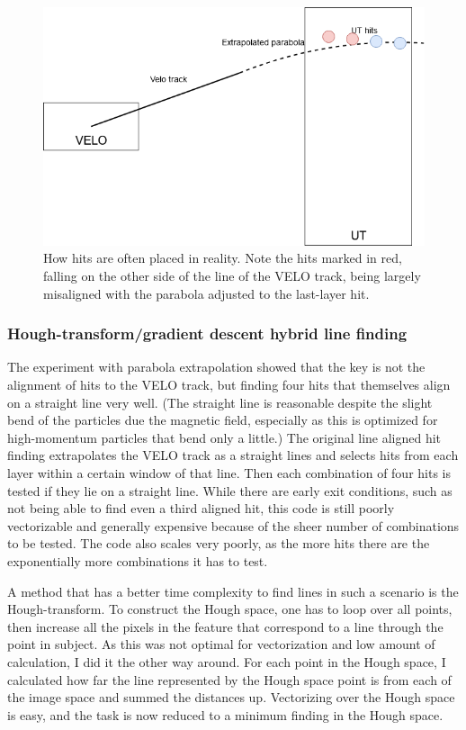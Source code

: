 \documentclass[12pt]{article}
\begin{document}
\begin{figure}[H]
	\begin{center}
		\includegraphics[width=.75\textwidth]{velout_parabola_misfit}
	\end{center}
	\caption{How hits are often placed in reality. Note the hits marked in red, falling on the other side of the line of the VELO track, being largely misaligned with the parabola adjusted to the last-layer hit.}
	\label{fig_velout_parabola_misfit}
\end{figure}


\subsubsection{Hough-transform/gradient descent hybrid line finding}

The experiment with parabola extrapolation showed that the key is not the alignment of hits to the VELO track, but finding four hits that themselves align on a straight line very well. (The straight line is reasonable despite the slight bend of the particles due the magnetic field, especially as this is optimized for high-momentum particles that bend only a little.) The original line aligned hit finding extrapolates the VELO track as a straight lines and selects hits from each layer within a certain window of that line. Then each combination of four hits is tested if they lie on a straight line. While there are early exit conditions, such as not being able to find even a third aligned hit, this code is still poorly vectorizable and generally expensive because of the sheer number of combinations to be tested. The code also scales very poorly, as the more hits there are the exponentially more combinations it has to test.
\vspace{1pc}

A method that has a better time complexity to find lines in such a scenario is the Hough-transform\cite{wiki_hough_transform}. To construct the Hough space, one has to loop over all points, then increase all the pixels in the feature that correspond to a line through the point in subject. As this was not optimal for vectorization and low amount of calculation, I did it the other way around. For each point in the Hough space, I calculated how far the line represented by the Hough space point is from each of the image space and summed the distances up. Vectorizing over the Hough space is easy, and the task is now reduced to a minimum finding in the Hough space.
\end{document}
